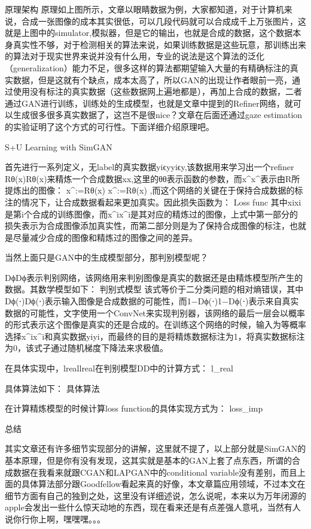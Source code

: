 原理架构 原理如上图所示，文章以眼睛数据为例，大家都知道，对于计算机来说，合成一张图像的成本其实很低，可以几段代码就可以合成成千上万张图片，这就是上图中的simulator,模拟器，但是它的输出，也就是合成的数据，这个数据本身真实性不够，对于检测相关的算法来说，如果训练数据是这些玩意，那训练出来的算法对于现实世界来说并没有什么用，专业的说法是这个算法的泛化（generalization）能力不足，很多这样的算法都期望输入大量的有精确标注的真实数据，但是这就有个缺点，成本太高了，所以GAN的出现让作者眼前一亮，通过使用没有标注的真实数据（这些数据网上遍地都是），再加上合成的数据，二者通过GAN进行训练，训练处的生成模型，也就是文章中提到的Refiner网络，就可以生成很多很多真实数据了，这岂不是很nice？文章在后面还通过gaze estimation的实验证明了这个方式的可行性。下面详细介绍原理吧。

S+U Learning with SimGAN

首先进行一系列定义，无label的真实数据yiϵyyiϵy,该数据用来学习出一个refiner Rθ(x)Rθ(x)来精炼一个合成数据xx,这里的θθ表示函数的参数，而x^x^表示由R所提炼出的图像：
x^:=Rθ(x)
x^:=Rθ(x)
,而这个网络的关键在于保持合成数据的标注的情况下，让合成数据看起来更加真实。因此损失函数为： Loss func 其中xixi是第i个合成的训练图像，而x^ix^i是其对应的精炼过的图像，上式中第一部分的损失表示为合成图像添加真实性，而第二部分则是为了保持合成图像的标注，也就是尽量减少合成的图像和精炼过的图像之间的差异。

当然上面只是GAN中的生成模型部分，那判别模型呢？

DϕDϕ表示判别网络，该网络用来判别图像是真实的数据还是由精炼模型所产生的数据。其数学模型如下： 判别式模型 该式等价于二分类问题的相对熵错误，其中Dϕ(⋅)Dϕ(⋅)表示输入图像是合成数据的可能性，而1−Dϕ(⋅)1−Dϕ(⋅)表示来自真实数据的可能性，文字使用一个ConvNet来实现判别器，该网络的最后一层会以概率的形式表示这个图像是真实的还是合成的。在训练这个网络的时候，输入为等概率选择x^ix^i和真实数据yiyi，而最终的目的是将精炼数据标注为1，将真实数据标注为0，该式子通过随机梯度下降法来求极值。

在具体实现中，lreallreal在判别模型DD中的计算方式： l_real

具体算法如下： 具体算法

在计算精炼模型的时候计算loss function的具体实现方式为： loss_imp

总结

其实文章还有许多细节实现部分的讲解，这里就不提了，以上部分就是SimGAN的基本原理，但是你有没有发现，这其实就是基本的GAN上套了点东西，所谓的合成数据在我看来就跟CGAN和LAPGAN中的conditional variable没有差别，而且上面的具体算法部分跟Goodfellow看起来真的好像，本文章篇应用领域，不过本文在细节方面有自己的独到之处，这里没有详细述说，怎么说呢，本来以为万年闭源的apple会发出一些什么惊天动地的东西，现在看来还是有点差强人意吼，当然有人说你行你上啊，嘿嘿嘿。。。

